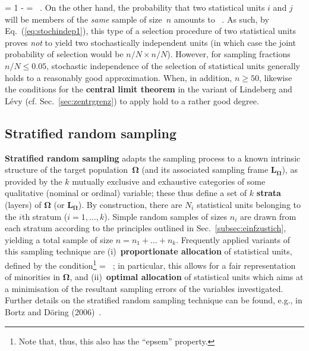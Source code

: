 = 1 -  =  \ .
\ee
%
On the other hand, the probability that two statistical units $i$ 
and $j$ will be members of the \textit{same} sample of size~$n$
amounts to
%
\be
{} \times {} \ .
\ee
%
As such, by Eq.~(\ref{eq:stochindep1}), this type of a selection 
procedure of two statistical units proves \textit{not} to yield two 
stochastically independent units (in which case the joint 
probability of selection would be $n/N \times n/N$). However, for 
sampling fractions $n/N \leq 0.05$, stochastic independence of the 
selection of statistical units generally holds to a reasonably 
good approximation. When, in addition, $n \geq 50$, likewise the 
conditions for the \textbf{central limit theorem} in the variant of 
Lindeberg and L\'{e}vy (cf. Sec.~\ref{sec:zentrgrenz}) to apply 
hold to a rather good degree.

\subsection[Stratified random sampling]{Stratified random sampling}
\textbf{Stratified random sampling} adapts the sampling process to
a known intrinsic structure of the target 
population~$\boldsymbol{\Omega}$ (and its associated sampling 
frame $\boldsymbol{L_{\Omega}}$), as provided by the $k$ mutually 
exclusive and exhaustive categories of some qualitative (nominal 
or ordinal) variable; these thus define a set of $k$
\textbf{strata} (layers) of $\boldsymbol{\Omega}$ (or
$\boldsymbol{L_{\Omega}}$). By construction, there are $N_{i}$
statistical units belonging to the $i$th stratum ($i=1, \ldots,
k$). Simple random samples of sizes $n_{i}$ are drawn from each
stratum according to the principles outlined in
Sec.~\ref{subsec:einfzustich}, yielding a total sample of size
$n=n_{1}+\ldots+n_{k}$. Frequently applied variants of this
sampling technique are (i)~\textbf{proportionate allocation} of
statistical units, defined by the condition\footnote{Note that,
thus, this also has the ``epsem'' property.}
%
\be
{} \stackrel{!}{=} 
\qquad\Rightarrow\qquad
{} =  \ ;
\ee
%
in particular, this allows for a fair representation of minorities 
in $\boldsymbol{\Omega}$, and (ii)~\textbf{optimal allocation} of 
statistical units which aims at a minimisation of the resultant 
sampling errors of the variables investigated. Further details on 
the stratified random sampling technique can be found, e.g., in 
Bortz and D\"{o}ring (2006)~.

